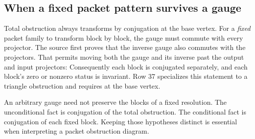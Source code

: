 \subsection{When a fixed packet pattern survives a gauge}
Total obstruction always transforms by conjugation at the base vertex. For a \emph{fixed} packet family to transform block by block, the gauge must commute with every projector.
The source first proves that the inverse gauge also commutes with the projectors. That permits moving both the gauge and its inverse past the output and input projectors:
Consequently each block is conjugated separately, and each block's zero or nonzero status is invariant. Row 37 specializes this statement to a triangle obstruction and requires  at the base vertex.

An arbitrary gauge need not preserve the blocks of a fixed resolution. The unconditional fact is conjugation of the total obstruction. The conditional fact is conjugation of each fixed block. Keeping those hypotheses distinct is essential when interpreting a packet obstruction diagram.
